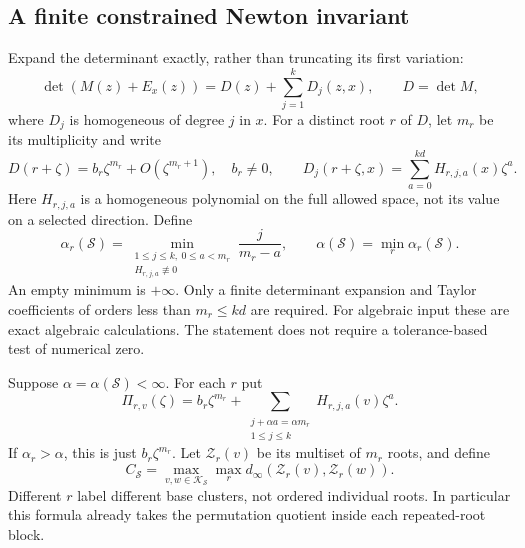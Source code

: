 \subsection{A finite constrained Newton invariant}
Expand the determinant exactly, rather than truncating its first
variation:
\begin{equation}\label{eq:det-homogeneous}
 \det(M(z)+E_x(z))=D(z)+\sum_{j=1}^k D_j(z,x),
 \qquad D=\det M,
\end{equation}
where $D_j$ is homogeneous of degree $j$ in $x$.
For a distinct root $r$ of $D$, let $m_r$ be its multiplicity and write
\[
 D(r+\zeta)=b_r\zeta^{m_r}+O(\zeta^{m_r+1}),\quad b_r\ne0,
 \qquad
 D_j(r+\zeta,x)=\sum_{a=0}^{kd}H_{r,j,a}(x)\zeta^a.
\]
Here $H_{r,j,a}$ is a homogeneous polynomial on the full allowed
space, not its value on a selected direction. Define
\begin{equation}\label{eq:constrained-exponent}
 \alpha_r(\mathcal S)=
 \min_{\substack{1\le j\le k,\ 0\le a<m_r\\
                         H_{r,j,a}\not\equiv0}}
                    \frac{j}{m_r-a},\qquad
 \alpha(\mathcal S)=\min_r\alpha_r(\mathcal S).
\end{equation}
An empty minimum is $+\infty$. Only a finite determinant expansion
and Taylor coefficients of orders less than $m_r\le kd$ are required.
For algebraic input these are exact algebraic calculations. The
statement does not require a tolerance-based test of numerical zero.

Suppose $\alpha=\alpha(\mathcal S)<\infty$. For each $r$ put
\begin{equation}\label{eq:newton-edge-polynomial}
 \Pi_{r,v}(\zeta)=b_r\zeta^{m_r}+
       \sum_{\substack{j+\alpha a=\alpha m_r\\1\le j\le k}}
                        H_{r,j,a}(v)\zeta^a.
\end{equation}
If $\alpha_r>\alpha$, this is just $b_r\zeta^{m_r}$.
Let $\mathcal Z_r(v)$ be its multiset of $m_r$ roots, and define
\begin{equation}\label{eq:newton-leading-constant}
 C_{\mathcal S}=
 \max_{v,w\in\mathcal K_{\mathcal S}}
               \max_r d_\infty(\mathcal Z_r(v),\mathcal Z_r(w)).
\end{equation}
Different $r$ label different base clusters, not ordered individual
roots. In particular this formula already takes the permutation
quotient inside each repeated-root block.

